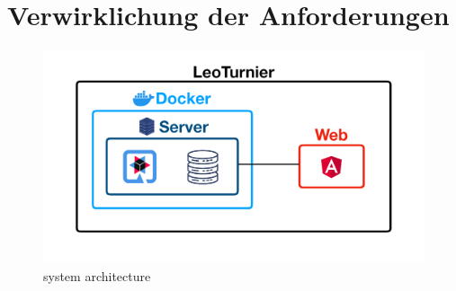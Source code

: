 \section{Verwirklichung der Anforderungen}

\begin{figure}[H]
    \centering
    \caption{system architecture}
    \includegraphics[scale=0.25]{pics/system_architecture.png}
\end{figure}

